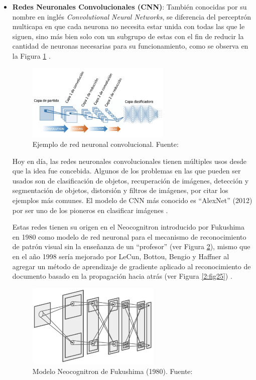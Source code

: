 \begin{itemize}
\begin{itemize}
		\item \textbf{Redes Neuronales Convolucionales (CNN)}: También conocidas por su nombre en inglés \textit{Convolutional Neural Networks}, se diferencia del perceptrón multicapa en que cada neurona no necesita estar unida con todas las que le siguen, sino más bien solo con un subgrupo de estas con el fin de reducir la cantidad de neuronas necesarias para su funcionamiento, como se observa en la Figura \ref{2:fig23} \parencite{gl_calvo2017clasifrna}.
		\begin{figure}[h]
			\begin{center}
				\includegraphics[width=0.65\textwidth]{2/figures/cnn.jpg}
				\caption{Ejemplo de red neuronal convolucional. Fuente: \cite{gl_calvo2017clasifrna}}
				\label{2:fig23}
			\end{center}
		\end{figure}
		
		Hoy en día, las redes neuronales convolucionales tienen múltiples usos desde que la idea fue concebida. Algunos de los problemas en las que pueden ser usados son de clasificación de objetos, recuperación de imágenes, detección y segmentación de objetos, distorsión y filtros de imágenes, por citar los ejemplos más comunes. El modelo de CNN más conocido es “AlexNet” (2012) por ser uno de los pioneros en clasificar imágenes \parencite{tec_li2019cnn}.
		
		Estas redes tienen su origen en el Neocognitron introducido por Fukushima en 1980 como modelo de red neuronal para el mecanismo de reconocimiento de patrón visual sin la enseñanza de un “profesor” (ver Figura \ref{2:fig24}), mismo que en el año 1998 sería mejorado por LeCun, Bottou, Bengio y Haffner al agregar un método de aprendizaje de gradiente aplicado al reconocimiento de documento basado en la propagación hacia atrás (ver Figura \ref{2:fig25}) \parencite{tec_li2019cnn}.
		\begin{figure}[htbp]
			\begin{center}
				\includegraphics[width=0.6\textwidth]{2/figures/neocognitron.jpg}
				\caption{Modelo Neocognitron de Fukushima (1980). Fuente: \cite{tec_li2019cnn}}
				\label{2:fig24}
				

\end{center}
\end{figure}
\end{itemize}
\end{itemize}
